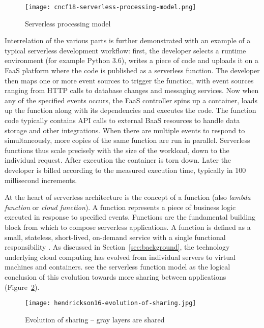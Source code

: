 \begin{figure}[h]
  \centering
  \texttt{[image: cncf18-serverless-processing-model.png]}
  \caption{Serverless processing model \parencite{cncf18serverlessWG}}
  \label{fig:processingModel}
\end{figure}

Interrelation of the various parts is further demonstrated with an example of a typical serverless development workflow: first, the developer selects a runtime environment (for example Python 3.6), writes a piece of code and uploads it on a FaaS platform where the code is published as a serverless function. The developer then maps one or more event sources to trigger the function, with event sources ranging from HTTP calls to database changes and messaging services. Now when any of the specified events occurs, the FaaS controller spins up a container, loads up the function along with its dependencies and executes the code. The function code typically contains API calls to external BaaS resources to handle data storage and other integrations. When there are multiple events to respond to simultaneously, more copies of the same function are run in parallel. Serverless functions thus scale precisely with the size of the workload, down to the individual request. After execution the container is torn down. Later the developer is billed according to the measured execution time, typically in 100 millisecond increments. \parencite{awslambda0218}

At the heart of serverless architecture is the concept of a function (also \textit{lambda function} or \textit{cloud function}). A function represents a piece of business logic executed in response to specified events. Functions are the fundamental building block from which to compose serverless applications. A function is defined as a small, stateless, short-lived, on-demand service with a single functional responsibility \parencite{van2017spec}. As discussed in Section~\ref{sec:background}, the technology underlying cloud computing has evolved from individual servers to virtual machines and containers. \textcite{hendrickson16openlambda} see the serverless function model as the logical conclusion of this evolution towards more sharing between applications (Figure~\ref{fig:evolutionOfSharing}).

\begin{figure}[h]
  \centering
  \texttt{[image: hendrickson16-evolution-of-sharing.jpg]}
  \caption{Evolution of sharing -- gray layers are shared \parencite{hendrickson16openlambda}}
  \label{fig:evolutionOfSharing}
\end{figure}

